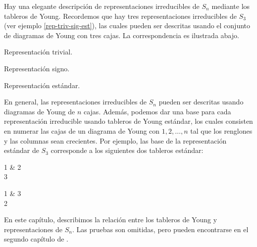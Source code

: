 \documentclass[12pt]{book}
\theoremstyle{definition}
\newcounter{in}
\newcounter{ini}
\begin{document}
Hay una elegante descripción de representaciones irreducibles de
$S_{n}$ mediante los tableros de Young. Recordemos que hay tres representaciones irreducibles de
$S_{3}$ (ver ejemplo \ref{rep-triv-sig-est}), las cuales pueden ser descritas usando el conjunto de diagramas de
Young con tres cajas. La correspondencia es ilustrada abajo.

\begin{center}
  \begin{minipage}[h]{0.3\linewidth}
    \centering

    Representación trivial.
  \end{minipage}
  \begin{minipage}[h]{0.3\linewidth}
    \centering

    Representación signo.
  \end{minipage}
  \begin{minipage}[h]{0.3\linewidth}
    \centering

    Representación estándar.
  \end{minipage}
\end{center}

En general, las representaciones irreducibles de $S_{n}$ pueden ser
descritas usando diagramas de Young de $n$ cajas. Además, podemos dar
una base para cada representación irreducible usando tableros de
Young estándar, los cuales consisten en numerar las cajas de un diagrama de
Young con $1,2,\ldots,n$ tal que los renglones y las columnas sean
crecientes. Por ejemplo, las base de la representación estándar de
$S_{3}$ corresponde a los siguientes dos tableros estándar:

\begin{center}
  \begin{ytableau}
    1 & 2\\
    3
  \end{ytableau} \qquad
  \begin{ytableau}
    1 & 3\\
    2
  \end{ytableau}
\end{center}

En este capítulo, describimos la relación entre los tableros de Young
y representaciones de $S_{n}$. Las pruebas son omitidas, pero pueden
encontrarse en el segundo capítulo de \cite{sagan2001symmetric}.
\end{document}

